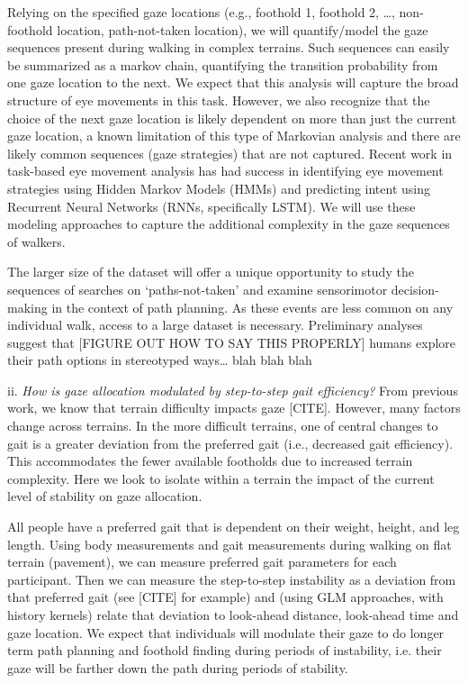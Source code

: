 Relying on the specified gaze locations (e.g., foothold 1, foothold 2,
\ldots, non-foothold location, path-not-taken location), we will
quantify/model the gaze sequences present during walking in complex
terrains. Such sequences can easily be summarized as a markov chain,
quantifying the transition probability from one gaze location to the
next. We expect that this analysis will capture the broad structure of
eye movements in this task. However, we also recognize that the choice
of the next gaze location is likely dependent on more than just the
current gaze location, a known limitation of this type of Markovian
analysis and there are likely common sequences (gaze strategies) that
are not captured. Recent work in task-based eye movement analysis has
had success in identifying eye movement strategies using Hidden Markov
Models (HMMs) and predicting intent using Recurrent Neural Networks
(RNNs, specifically LSTM). We will use these modeling approaches to
capture the additional complexity in the gaze sequences of walkers.

The larger size of the dataset will offer a unique opportunity to study
the sequences of searches on `paths-not-taken' and examine sensorimotor
decision-making in the context of path planning. As these events are
less common on any individual walk, access to a large dataset is
necessary. Preliminary analyses suggest that {[}FIGURE OUT HOW TO SAY
THIS PROPERLY{]} humans explore their path options in stereotyped
ways\ldots{} blah blah blah

ii. \emph{How is gaze allocation modulated by step-to-step gait
efficiency?} From previous work, we know that terrain difficulty impacts
gaze {[}CITE{]}. However, many factors change across terrains. In the
more difficult terrains, one of central changes to gait is a greater
deviation from the preferred gait (i.e., decreased gait efficiency).
This accommodates the fewer available footholds due to increased terrain
complexity. Here we look to isolate within a terrain the impact of the
current level of stability on gaze allocation.

All people have a preferred gait that is dependent on their weight,
height, and leg length. Using body measurements and gait measurements
during walking on flat terrain (pavement), we can measure preferred gait
parameters for each participant. Then we can measure the step-to-step
instability as a deviation from that preferred gait (see {[}CITE{]} for
example) and (using GLM approaches, with history kernels) relate that
deviation to look-ahead distance, look-ahead time and gaze location. We
expect that individuals will modulate their gaze to do longer term path
planning and foothold finding during periods of instability, i.e. their
gaze will be farther down the path during periods of stability.

